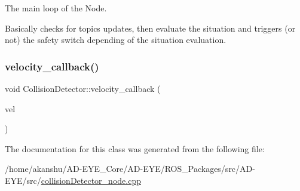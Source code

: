The main loop of the Node. 

Basically checks for topics updates, then evaluate the situation and triggers (or not) the safety switch depending of the situation evaluation. \mbox{\label{classCollisionDetector_a2ab3d4266ac3f872bb033235b10173ef}} 
\subsubsection{\texorpdfstring{velocity\+\_\+callback()}{velocity\_callback()}}
{\footnotesize\ttfamily void Collision\+Detector\+::velocity\+\_\+callback (\begin{DoxyParamCaption}\item[{const geometry\+\_\+msgs\+::\+Twist\+Stamped\+::\+Const\+Ptr \&}]{vel }\end{DoxyParamCaption})\hspace{0.3cm}{\ttfamily [inline]}}



The documentation for this class was generated from the following file\+:\begin{DoxyCompactItemize}
\item 
/home/akanshu/\+A\+D-\/\+E\+Y\+E\+\_\+\+Core/\+A\+D-\/\+E\+Y\+E/\+R\+O\+S\+\_\+\+Packages/src/\+A\+D-\/\+E\+Y\+E/src/\hyperlink{collisionDetector__node_8cpp}{collision\+Detector\+\_\+node.\+cpp}\end{DoxyCompactItemize}
